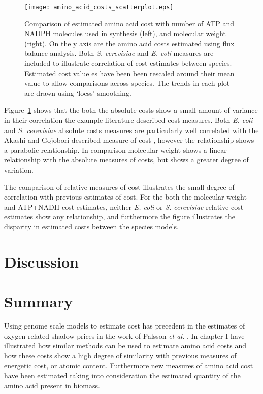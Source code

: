 \begin{figure}
\centering
\texttt{[image: amino\_acid\_costs\_scatterplot.eps]}
\caption[Comparison of the genome scale model derived cost data sets.]{Comparison of estimated amino acid cost with number of ATP and NADPH molecules used in synthesis (left), and molecular weight (right). On the y axis are the amino acid costs estimated using flux balance analysis. Both \emph{S. cerevisiae} and \emph{E. coli} measures are included to illustrate correlation of cost estimates between species. Estimated cost value
es have been been rescaled around their mean value to allow comparisons across species. The trends in each plot are drawn using `loess' smoothing.}
\label{figure:amino_acid_costs_scatterplot}
\end{figure}

Figure~\ref{figure:amino_acid_costs_scatterplot} shows that the both the absolute costs show a small amount of variance in their correlation the example literature described cost measures. Both \emph{E. coli} and \emph{S. cerevisiae} absolute costs measures are particularly well correlated with the Akashi and Gojobori described measure of cost \cite{akashi2002}, however the relationship shows a parabolic relationship. In comparison molecular weight shows a linear relationship with the absolute measures of costs, but shows a greater degree of variation.

The comparison of relative measures of cost illustrates the small degree of correlation with previous estimates of cost. For the both the molecular weight and ATP+NADH cost estimates, neither \emph{E. coli} or \emph{S. cerevisiae} relative cost estimates show any relationship, and furthermore the figure illustrates the disparity in estimated costs between the species models.

\section{Discussion}

\section{Summary}

Using genome scale models to estimate cost has precedent in the estimates of oxygen related shadow prices in the work of Palsson \emph{et al.} \cite{palsson}. In chapter I have illustrated how similar methods can be used to estimate amino acid costs and how these costs show a high degree of similarity with previous measures of energetic cost, or atomic content. Furthermore new measures of amino acid cost have been estimated taking into consideration the estimated quantity of the amino acid present in biomass.
